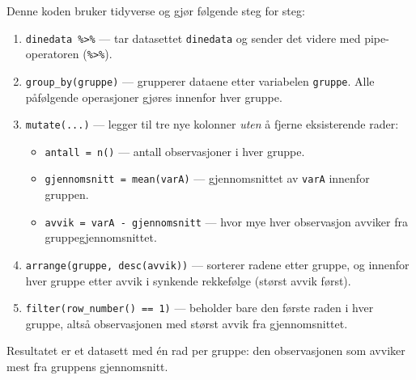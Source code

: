 \documentclass[
  norsk,
  letterpaper,
  DIV=11,
  numbers=noendperiod]{scrreprt}
\providecommand{\tightlist}{%
  \setlength{\itemsep}{0pt}\setlength{\parskip}{0pt}}
\theoremstyle{definition}
\theoremstyle{remark}
\begin{document}
\begin{tcolorbox}[enhanced jigsaw, breakable, colbacktitle=quarto-callout-note-color!10!white, arc=.35mm, leftrule=.75mm, bottomrule=.15mm, colback=white, coltitle=black, opacityback=0, toptitle=1mm, title=\textcolor{quarto-callout-note-color}{\faInfo}\hspace{0.5em}{Eksempel på svar fra KI-verktøy}, colframe=quarto-callout-note-color-frame, toprule=.15mm, opacitybacktitle=0.6, titlerule=0mm, bottomtitle=1mm, rightrule=.15mm, left=2mm]

Denne koden bruker tidyverse og gjør følgende steg for steg:

\begin{enumerate}
\def\labelenumi{\arabic{enumi}.}
\tightlist
\item
  \texttt{dinedata\ \%\textgreater{}\%} --- tar datasettet
  \texttt{dinedata} og sender det videre med pipe-operatoren
  (\texttt{\%\textgreater{}\%}).
\item
  \texttt{group\_by(gruppe)} --- grupperer dataene etter variabelen
  \texttt{gruppe}. Alle påfølgende operasjoner gjøres innenfor hver
  gruppe.
\item
  \texttt{mutate(...)} --- legger til tre nye kolonner \emph{uten} å
  fjerne eksisterende rader:

  \begin{itemize}
  \tightlist
  \item
    \texttt{antall\ =\ n()} --- antall observasjoner i hver gruppe.
  \item
    \texttt{gjennomsnitt\ =\ mean(varA)} --- gjennomsnittet av
    \texttt{varA} innenfor gruppen.
  \item
    \texttt{avvik\ =\ varA\ -\ gjennomsnitt} --- hvor mye hver
    observasjon avviker fra gruppegjennomsnittet.
  \end{itemize}
\item
  \texttt{arrange(gruppe,\ desc(avvik))} --- sorterer radene etter
  gruppe, og innenfor hver gruppe etter avvik i synkende rekkefølge
  (størst avvik først).
\item
  \texttt{filter(row\_number()\ ==\ 1)} --- beholder bare den første
  raden i hver gruppe, altså observasjonen med størst avvik fra
  gjennomsnittet.
\end{enumerate}

Resultatet er et datasett med én rad per gruppe: den observasjonen som
avviker mest fra gruppens gjennomsnitt.

\end{tcolorbox}
\end{document}
